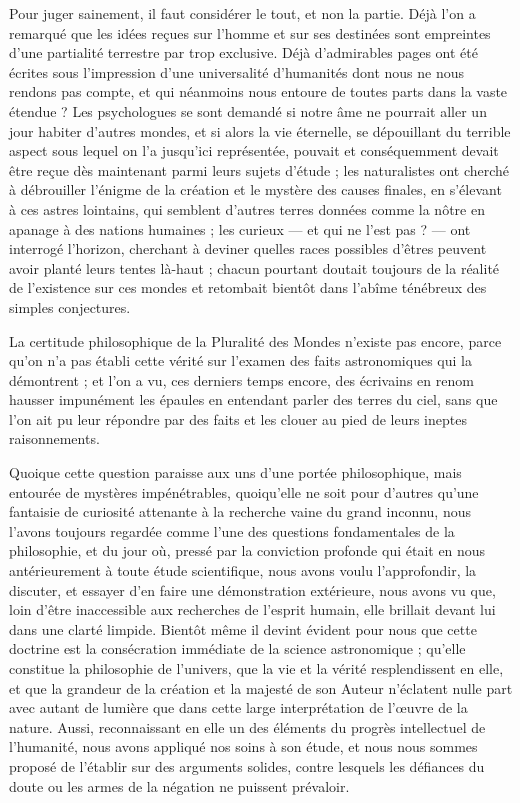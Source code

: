 \documentclass[a4paper, 11pt, oneside, landscape]{article}
\begin{document}
Pour juger sainement, il faut considérer le tout, et non la partie. Déjà l'on a remarqué que les idées reçues sur l'homme et sur ses destinées sont empreintes d'une partialité terrestre par trop exclusive. Déjà d'admirables pages ont été écrites sous l'impression d'une universalité d'humanités dont nous ne nous rendons pas compte, et qui néanmoins nous entoure de toutes parts dans la vaste étendue ? Les psychologues se sont demandé si notre âme ne pourrait aller un jour habiter d'autres mondes, et si alors la vie éternelle, se dépouillant du terrible aspect sous lequel on l'a jusqu'ici représentée, pouvait et conséquemment devait être reçue dès maintenant parmi leurs sujets d'étude ; les naturalistes ont cherché à débrouiller l'énigme de la création et le mystère des causes finales, en s'élevant à ces astres lointains, qui semblent d'autres terres données comme la nôtre en apanage à des nations humaines ; les curieux --- et qui ne l'est pas ? --- ont interrogé l'horizon, cherchant à deviner quelles races possibles d'êtres peuvent avoir planté leurs tentes là-haut ; chacun pourtant doutait toujours de la réalité de l'existence sur ces mondes et retombait bientôt dans l'abîme ténébreux des simples conjectures.

La certitude philosophique de la Pluralité des Mondes n'existe pas encore, parce qu'on n'a pas établi cette vérité sur l'examen des faits astronomiques qui la démontrent ; et l'on a vu, ces derniers temps encore, des écrivains en renom hausser impunément les épaules en entendant parler des terres du ciel, sans que l'on ait pu leur répondre par des faits et les clouer au pied de leurs ineptes raisonnements.

Quoique cette question paraisse aux uns d'une portée philosophique, mais entourée de mystères impénétrables, quoiqu'elle ne soit pour d'autres qu'une fantaisie de curiosité attenante à la recherche vaine du grand inconnu, nous l'avons toujours regardée comme l'une des questions fondamentales de la philosophie, et du jour où, pressé par la conviction profonde qui était en nous antérieurement à toute étude scientifique, nous avons voulu l'approfondir, la discuter, et essayer d'en faire une démonstration extérieure, nous avons vu que, loin d'être inaccessible aux recherches de l'esprit humain, elle brillait devant lui dans une clarté limpide. Bientôt même il devint évident pour nous que cette doctrine est la consécration immédiate de la science astronomique ; qu'elle constitue la philosophie de l'univers, que la vie et la vérité resplendissent en elle, et que la grandeur de la création et la majesté de son Auteur n'éclatent nulle part avec autant de lumière que dans cette large interprétation de l'œuvre de la nature. Aussi, reconnaissant en elle un des éléments du progrès intellectuel de l'humanité, nous avons appliqué nos soins à son étude, et nous nous sommes proposé de l'établir sur des arguments solides, contre lesquels les défiances du doute ou les armes de la négation ne puissent prévaloir.
\end{document}
